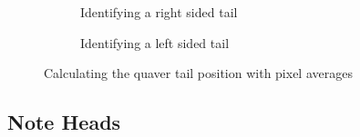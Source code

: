 \begin{figure}[h!]
    \centering

    \begin{subfigure}[b]{.45\linewidth}
        \centering
      \caption{Identifying a right sided tail}
      \label{fig:quaver-tail-average-position-right}
    \end{subfigure}
    \begin{subfigure}[b]{.45\linewidth}
        \centering
      \caption{Identifying a left sided tail}
      \label{fig:quaver-tail-average-position-left}
    \end{subfigure}
    
      \caption{Calculating the quaver tail position with pixel averages}
      \label{fig:quaver-tail-average-position}
\end{figure}

\subsection{Note Heads}

